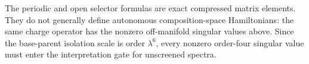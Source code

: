 \begin{remark}
The periodic and open selector formulas are exact compressed matrix elements.
They do not generally define autonomous composition-space Hamiltonians: the
same charge operator has the nonzero off-manifold singular values above.  Since
the base-parent isolation scale is order $\lambda^6$, every nonzero order-four
singular value must enter the interpretation gate for unscreened spectra.
\end{remark}
